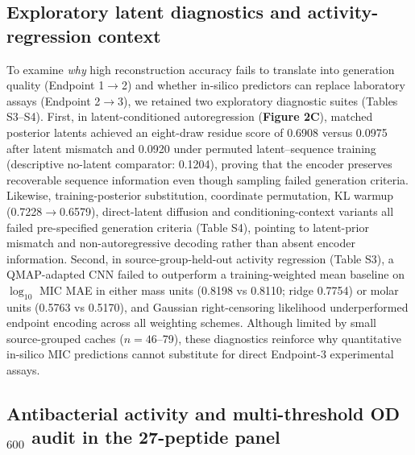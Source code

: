 \documentclass[unnumsec,webpdf,contemporary,large]{oup-authoring-template}
\newcommand{\rev}[1]{#1}
\begin{document}
\subsection{Exploratory latent diagnostics and activity-regression context}

\rev{To examine \emph{why} high reconstruction accuracy fails to translate into generation quality (Endpoint 1$\rightarrow$2) and whether in-silico predictors can replace laboratory assays (Endpoint 2$\rightarrow$3), we retained two exploratory diagnostic suites (Tables S3--S4). First, in latent-conditioned autoregression (\textbf{Figure 2C}), matched posterior latents achieved an eight-draw residue score of 0.6908 versus 0.0975 after latent mismatch and 0.0920 under permuted latent--sequence training (descriptive no-latent comparator: 0.1204), proving that the encoder preserves recoverable sequence information even though sampling failed generation criteria. Likewise, training-posterior substitution, coordinate permutation, KL warmup (0.7228$\rightarrow$0.6579), direct-latent diffusion and conditioning-context variants all failed pre-specified generation criteria (Table S4), pointing to latent-prior mismatch and non-autoregressive decoding rather than absent encoder information. Second, in source-group-held-out activity regression (Table S3), a QMAP-adapted CNN \cite{ref13,ref12} failed to outperform a training-weighted mean baseline on $\log_{10}$ MIC MAE in either mass units (0.8198 vs 0.8110; ridge 0.7754) or molar units (0.5763 vs 0.5170), and Gaussian right-censoring likelihood underperformed endpoint encoding across all weighting schemes. Although limited by small source-grouped caches ($n=46$--79), these diagnostics reinforce why quantitative in-silico MIC predictions cannot substitute for direct Endpoint-3 experimental assays.}

\subsection{Antibacterial activity and multi-threshold OD$_{600}$ audit in the 27-peptide panel}
\end{document}

